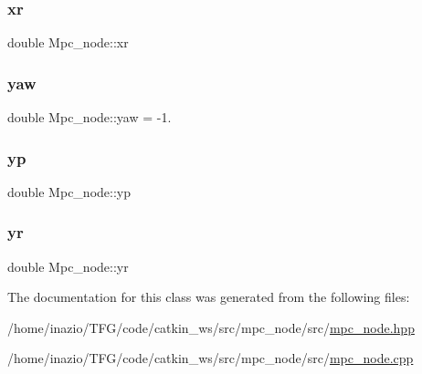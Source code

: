 \subsubsection{\texorpdfstring{xr}{xr}}
{\footnotesize\ttfamily double Mpc\+\_\+node\+::xr\hspace{0.3cm}{\ttfamily [private]}}

\mbox{\label{classMpc__node_a9b5da0aaf367d5b1f60f47eca976de2a}} 
\subsubsection{\texorpdfstring{yaw}{yaw}}
{\footnotesize\ttfamily double Mpc\+\_\+node\+::yaw = -\/1.\hspace{0.3cm}{\ttfamily [private]}}

\mbox{\label{classMpc__node_adb9780e9f20aa698a68fbc632b8e4f46}} 
\subsubsection{\texorpdfstring{yp}{yp}}
{\footnotesize\ttfamily double Mpc\+\_\+node\+::yp\hspace{0.3cm}{\ttfamily [private]}}

\mbox{\label{classMpc__node_a93c8464ce2e0446c7463bad6a52ee8a1}} 
\subsubsection{\texorpdfstring{yr}{yr}}
{\footnotesize\ttfamily double Mpc\+\_\+node\+::yr\hspace{0.3cm}{\ttfamily [private]}}



The documentation for this class was generated from the following files\+:\begin{DoxyCompactItemize}
\item 
/home/inazio/\+T\+F\+G/code/catkin\+\_\+ws/src/mpc\+\_\+node/src/\hyperlink{mpc__node_8hpp}{mpc\+\_\+node.\+hpp}\item 
/home/inazio/\+T\+F\+G/code/catkin\+\_\+ws/src/mpc\+\_\+node/src/\hyperlink{mpc__node_8cpp}{mpc\+\_\+node.\+cpp}\end{DoxyCompactItemize}
